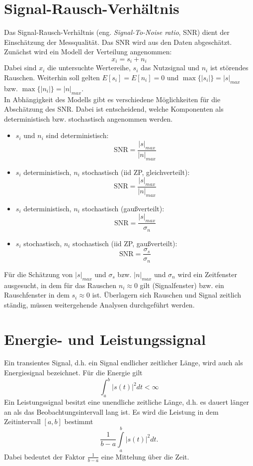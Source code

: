 \section{Signal-Rausch-Verhältnis}
Das Signal-Rausch-Verhältnis (eng. \textsl{Signal-To-Noise ratio}, SNR) dient der Einschätzung der Messqualität. Das SNR wird aus den Daten abgeschätzt. Zunächst wird ein Modell der Verteilung angenommen:
\[
x_i=s_i + n_i
\]
Dabei sind $x_i$ die untersuchte Wertereihe, $s_i$ das Nutzsignal und  $n_i$ ist störendes Rauschen. Weiterhin soll gelten $E[s_i]=E[n_i]=0$ und $\max\{|s_i|\}=|s|_{max}$ bzw. $\max\{|n_i|\}=|n|_{max}$.\\
In Abhängigkeit des Modells gibt es verschiedene Möglichkeiten für die Abschätzung des SNR. Dabei ist entscheidend, welche Komponenten als deterministisch bzw. stochastisch angenommen werden.
\begin {itemize}
\item $s_i$ und $n_i$ sind deterministisch:
\[
\mathrm{SNR} = \frac {|s|_{max}}{|n|_{max}}
\]
\item $s_i$ deterministisch, $n_i$ stochastisch (iid ZP, gleichverteilt):
\[
\mathrm{SNR} = \frac {|s|_{max}}{|n|_{max}}
\]
\item $s_i$ deterministisch, $n_i$ stochastisch (gaußverteilt):
\[
\mathrm{SNR} = \frac {|s|_{max}}{\sigma_n}
\]
\item $s_i$ stochastisch, $n_i$ stochastisch (iid ZP, gaußverteilt):
\[
\mathrm{SNR} = \frac {\sigma_s}{\sigma_n}
\]
\end{itemize}

Für die Schätzung von $|s|_{max}$ und $\sigma_s$ bzw. $|n|_{max}$ und $\sigma_n$ wird ein Zeitfenster ausgesucht, in dem für das Rauschen  $n_i\approx 0$ gilt (Signalfenster) bzw. ein Rauschfenster in dem $s_i \approx 0$ ist. Überlagern sich Rauschen und Signal zeitlich ständig, müssen weitergehende Analysen durchgeführt werden.


\section{Energie- und Leistungssignal}
Ein transientes Signal, d.h. ein Signal endlicher zeitlicher Länge, wird auch als Energiesignal bezeichnet.  Für die Energie gilt
\[
\int_a^b |s(t)|^2 dt < \infty
\]
Ein Leistungssignal besitzt eine unendliche zeitliche Länge, d.h. es dauert länger an als das Beobachtungsintervall lang ist. 
Es wird die Leistung in dem Zeitintervall $[a, b]$ bestimmt
\[
\frac{1}{b-a}\int\limits_a^b |s(t)|^2 dt.
\]
Dabei bedeutet der Faktor $\frac{1}{b-a}$ eine Mittelung über die Zeit.

